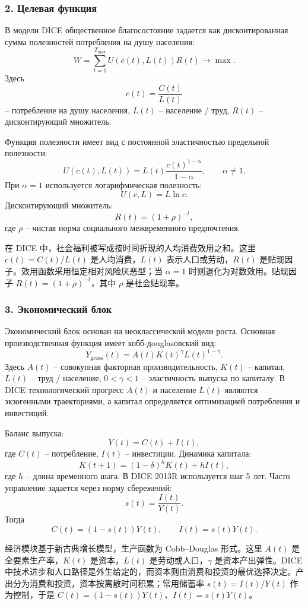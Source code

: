 \documentclass[12pt,a4paper]{article}
\newcommand{\zh}[1]{\par\noindent #1\par}
\begin{document}
\subsubsection*{2. Целевая функция}
В модели DICE общественное благосостояние задается как дисконтированная сумма полезностей потребления на душу населения:
\[
W=\sum_{t=1}^{T_{\max}}U(c(t),L(t))R(t)\to \max.
\]
Здесь
\[
c(t)=\frac{C(t)}{L(t)}
\]
-- потребление на душу населения, $L(t)$ -- население / труд, $R(t)$ -- дисконтирующий множитель.

Функция полезности имеет вид с постоянной эластичностью предельной полезности:
\[
U(c(t),L(t))=L(t)\frac{c(t)^{1-\alpha}}{1-\alpha},\qquad \alpha\ne 1.
\]
При $\alpha=1$ используется логарифмическая полезность:
\[
U(c,L)=L\ln c.
\]
Дисконтирующий множитель:
\[
R(t)=(1+\rho)^{-t},
\]
где $\rho$ -- чистая норма социального межвременного предпочтения.
\zh{在 DICE 中，社会福利被写成按时间折现的人均消费效用之和。这里 \(c(t)=C(t)/L(t)\) 是人均消费，\(L(t)\) 表示人口或劳动，\(R(t)\) 是贴现因子。效用函数采用恒定相对风险厌恶型；当 \(\alpha=1\) 时则退化为对数效用。贴现因子 \(R(t)=(1+\rho)^{-t}\)，其中 \(\rho\) 是社会贴现率。}

\subsubsection*{3. Экономический блок}
Экономический блок основан на неоклассической модели роста. Основная производственная функция имеет кобб-дouglasовский вид:
\[
Y_{\mathrm{gross}}(t)=A(t)K(t)^\gamma L(t)^{1-\gamma}.
\]
Здесь $A(t)$ -- совокупная факторная производительность, $K(t)$ -- капитал, $L(t)$ -- труд / население, $0<\gamma<1$ -- эластичность выпуска по капиталу. В DICE технологический прогресс $A(t)$ и население $L(t)$ являются экзогенными траекториями, а капитал определяется оптимизацией потребления и инвестиций.

Баланс выпуска:
\[
Y(t)=C(t)+I(t),
\]
где $C(t)$ -- потребление, $I(t)$ -- инвестиции. Динамика капитала:
\[
K(t+1)=(1-\delta)^hK(t)+hI(t),
\]
где $h$ -- длина временного шага. В DICE 2013R используется шаг 5 лет. Часто управление задается через норму сбережений:
\[
s(t)=\frac{I(t)}{Y(t)}.
\]
Тогда
\[
C(t)=(1-s(t))Y(t),\qquad I(t)=s(t)Y(t).
\]
\zh{经济模块基于新古典增长模型，生产函数为 Cobb--Douglas 形式。这里 \(A(t)\) 是全要素生产率，\(K(t)\) 是资本，\(L(t)\) 是劳动或人口，\(\gamma\) 是资本产出弹性。DICE 中技术进步和人口路径是外生给定的，而资本则由消费和投资的最优选择决定。产出分为消费和投资，资本按离散时间积累；常用储蓄率 \(s(t)=I(t)/Y(t)\) 作为控制，于是 \(C(t)=(1-s(t))Y(t)\)、\(I(t)=s(t)Y(t)\)。}
\end{document}
